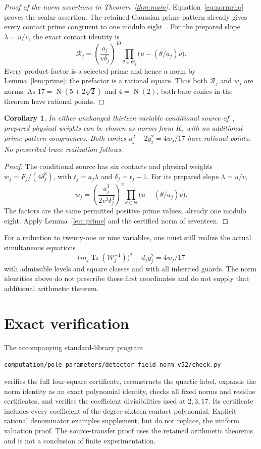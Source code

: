 \documentclass[11pt,a4paper]{article}
\newtheorem{corollary}[theorem]{Corollary}
\DeclareMathOperator{\Nm}{N}\DeclareMathOperator{\Tr}{Tr}
\begin{document}
\begin{proof}[Proof of the norm assertions in Theorem~\ref{thm:main}]
Equation~\eqref{eq:normrho} proves the scalar assertion. The retained
Gaussian prime pattern already gives every contact prime congruent to
one modulo eight~\cite[Section~3]{Dependencies}. For the prepared
slope $\lambda=u/v$, the exact contact identity is
\[
 \mathcal R_j=\left(\frac{a_j}{v\delta_j}\right)^{10}
               \prod_{\theta\in\Theta_j}
                           \bigl(u-(\theta/a_j)v\bigr).
\]
Every product factor is a selected prime and hence a norm by
Lemma~\ref{lem:prime}; the prefactor is a rational square. Thus both
$\mathcal R_j$ and $w_j$ are norms. As $17=\Nm(5+2\sqrt2)$
and $4=\Nm(2)$, both bare conics in the theorem have rational points.
\end{proof}

\begin{corollary}\label{cor:conditional}
In either unchanged thirteen-variable conditional source
of~\cite{Conditional,Direct}, prepared
physical weights can be chosen as norms from $K$, with no additional
prime-pattern congruences. Both conics $u_j^2-2y_j^2=4w_j/17$ have
rational points. No prescribed-trace realization follows.
\end{corollary}
\begin{proof}
The conditional source has six contacts and physical weights
$w_j=F_j/(4\delta_j^8)$, with $t_j=a_j\lambda$ and
$\delta_j=t_j-1$. For its prepared slope $\lambda=u/v$,
\[
 w_j=\left(\frac{a_j^3}{2v^3\delta_j^4}\right)^2
             \prod_{\theta\in\Theta}\bigl(u-(\theta/a_j)v\bigr).
\]
The factors are the same permitted positive prime values, already
one modulo eight. Apply Lemma~\ref{lem:prime} and the certified norm
of seventeen.
\end{proof}

For a reduction to twenty-one or nine variables, one must still
realize the actual simultaneous equations
\[
       \bigl(m_j\Tr(\mathcal W_j^{-1})\bigr)^2-d_jy_j^2=4w_j/17
\]
with admissible levels and square classes and with all inherited
guards. The norm identities above do not prescribe these first
coordinates and do not supply that additional arithmetic theorem.

\section{Exact verification}
The accompanying standard-library program
\begin{center}\small
\nolinkurl{computation/pole_parameters/detector_field_norm_v52/check.py}
\end{center} verifies the full four-square
certificate, reconstructs the quartic label, expands the norm identity
as an exact polynomial identity, checks all fixed norms and residue
certificates, and verifies the coefficient divisibilities used at
$2,3,17$. Its certificate includes every coefficient of the
degree-sixteen contact polynomial. Explicit rational denominator
examples supplement, but do not replace, the uniform valuation proof.
The source-transfer proof uses the retained arithmetic theorems and is
not a conclusion of finite experimentation.
\end{document}
